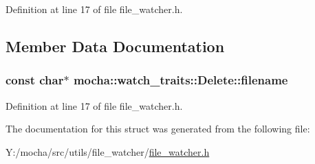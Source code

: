 Definition at line 17 of file file\_\-watcher.h.



\subsection{Member Data Documentation}
\hypertarget{structmocha_1_1watch__traits_1_1_delete_a70dc9534c39603b7a4997f5b737c31e3}{
\subsubsection[{filename}]{\setlength{\rightskip}{0pt plus 5cm}const char$\ast$ {\bf mocha::watch\_\-traits::Delete::filename}}}
\label{structmocha_1_1watch__traits_1_1_delete_a70dc9534c39603b7a4997f5b737c31e3}


Definition at line 17 of file file\_\-watcher.h.



The documentation for this struct was generated from the following file:\begin{DoxyCompactItemize}
\item 
Y:/mocha/src/utils/file\_\-watcher/\hyperlink{file__watcher_8h}{file\_\-watcher.h}\end{DoxyCompactItemize}
